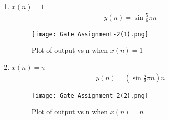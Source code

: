 \documentclass[journal,12pt,twocolumn]{IEEEtran}
\begin{document}
\begin{enumerate}[label= (\alph*)]
    \item $x(n)=1$
    \begin{align}
        y(n)=\sin{\frac{5}{6}\pi n}
    \end{align}
    \begin{figure}[!ht]
    \centering
    \texttt{[image: Gate Assignment-2(1).png]}
    \caption{Plot of output vs n when $x(n)=1$}
    \label{a}
    \end{figure}
    \item $x(n)=n$
    \begin{align}
        y(n)=\left(\sin{\frac{5}{6}\pi n}\right)n
    \end{align}
    \begin{figure}[!ht]
    \centering
    \texttt{[image: Gate Assignment-2(2).png]}
    \caption{Plot of output vs n when $x(n)=n$}
    \label{a}
    \end{figure}
\end{enumerate}
\end{document}
